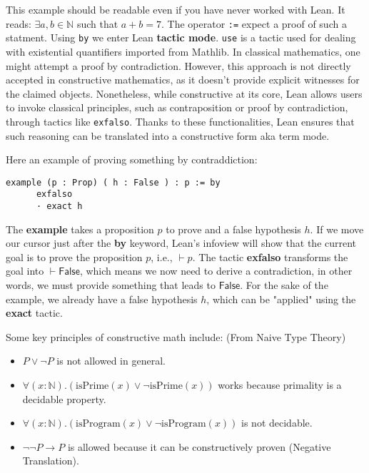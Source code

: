 This example should be readable even if you have never worked with Lean.
It reads: $\exists a, b \in \mathbb{N}$ such that $a + b = 7$.
The operator \lstinline|:=| expect a proof of such a statment.
Using \lstinline|by| we enter Lean \textbf{tactic mode}.
\lstinline|use| is a tactic used for dealing with existential quantifiers imported from Mathlib.
In classical mathematics, one might attempt a proof by contradiction. 
However, this approach is not 
directly accepted in constructive mathematics, as it doesn't provide 
explicit witnesses for the claimed objects.
Nonetheless, while constructive at its core, Lean allows users to invoke classical principles, 
such as contraposition or proof by contradiction, through tactics like \lstinline|exfalso|. 
Thanks to these functionalities, Lean ensures that such reasoning can be translated 
into a constructive form aka term mode. 
\begin{example}
Here an example of proving something by contraddiction:
   \begin{lstlisting}[language=Lean]
    example (p : Prop) ( h : False ) : p := by
      exfalso
      · exact h
\end{lstlisting} 
The \textbf{example} takes a proposition $p$ to prove and a false hypothesis $h$.  
If we move our cursor just after the \textbf{by} keyword, Lean's infoview will show 
that the current goal is to prove the proposition $p$, i.e., $\vdash p$.  
The tactic \textbf{exfalso} transforms the goal into $\vdash \mathsf{False}$, which means we now need to derive a contradiction, in other words, we must provide something that leads to $\mathsf{False}$.  
For the sake of the example, we already have a false hypothesis $h$, which can be "applied" using the \textbf{exact} tactic.
\end{example}

Some key principles of constructive math include: (From Naive Type Theory)
\begin{itemize}
    \item $P \lor \neg P$ is not allowed in general.
    \item $\forall (x: \mathbb{N}) . (\text{isPrime}(x) \lor \neg \text{isPrime}(x))$ works because primality is a decidable property.
    \item $\forall (x: \mathbb{N}) . (\text{isProgram}(x) \lor \neg \text{isProgram}(x))$ is not decidable.
    \item $\neg \neg P \to P$ is allowed because it can be constructively proven (Negative Translation).
\end{itemize}
